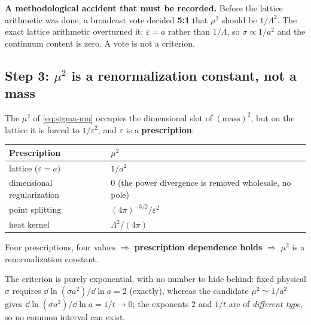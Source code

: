 \begin{keybox}
\textbf{A methodological accident that must be recorded.} Before the lattice arithmetic was done, a
broadcast vote decided \textbf{5:1} that $\mu^{2}$ should be $1/\Lambda^{2}$. The exact lattice
arithmetic overturned it: $\varepsilon=a$ rather than $1/\Lambda$, so $\sigma\propto1/a^{2}$ and the
continuum content is zero. A vote is not a criterion. \LN
\end{keybox}

\subsection{Step 3: $\mu^{2}$ is a renormalization constant, not a mass}

The $\mu^{2}$ of \eqref{eq:sigma-mu} occupies the dimensional slot of $(\text{mass})^{2}$, but on the
lattice it is forced to $1/\varepsilon^{2}$, and $\varepsilon$ is a \textbf{prescription}: \LT
\begin{center}\footnotesize
\begin{tabular}{@{}l l@{}}
\toprule
Prescription & $\mu^{2}$\\
\midrule
lattice ($\varepsilon=a$) & $1/a^{2}$\\
dimensional regularization & $0$ (the power divergence is removed wholesale, no pole)\\
point splitting & $(4\pi)^{-3/2}/\varepsilon^{2}$\\
heat kernel & $\Lambda^{2}/(4\pi)$\\
\bottomrule
\end{tabular}
\end{center}
Four prescriptions, four values $\Rightarrow$ \textbf{prescription dependence holds} $\Rightarrow$
$\mu^{2}$ is a renormalization constant. \LT
{}

\noindent
The criterion is purely exponential, with no number to hide behind: fixed physical $\sigma$ requires
$\dd\ln(\sigma a^{2})/\dd\ln a=2$ (exactly), whereas the candidate $\mu^{2}\simeq1/a^{2}$ gives
$\dd\ln(\sigma a^{2})/\dd\ln a=1/t\to0$; the exponents $2$ and $1/t$ are of \emph{different type}, so
no common interval can exist. \LT
{}

